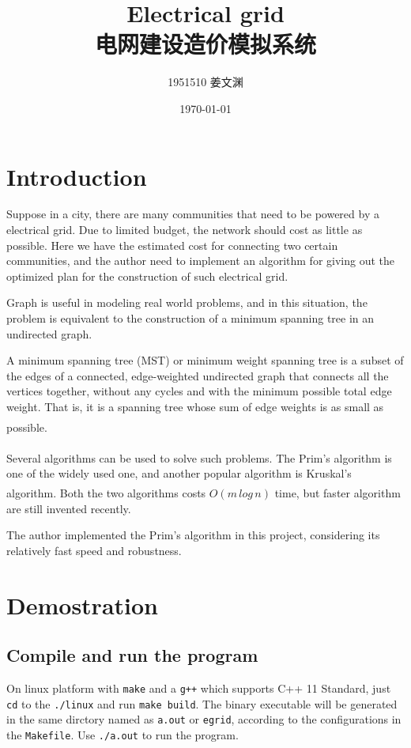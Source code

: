 \documentclass[cn,black,12pt,normal]{elegantnote}
\title{Electrical grid\\电网建设造价模拟系统}
\author{1951510\; 姜文渊}
\institute{\small \url{https://github.com/jwyjohn/Jwy_DataStructureHomework}}
\date{\today}
\newcommand{\uct}[1]{\textsuperscript{\textsuperscript{\cite{#1}}}}
\begin{document}
\maketitle

\section{Introduction}

Suppose in a city, there are many communities that need to be powered by a electrical grid. Due to limited budget, the network should cost as little as possible. Here we have the estimated cost for connecting two certain communities, and the author need to implement an algorithm for giving out the optimized plan for the construction of such electrical grid.

Graph is useful in modeling real world problems, and in this situation, the problem is equivalent to the construction of a minimum spanning tree in an undirected graph.

A minimum spanning tree (MST) or minimum weight spanning tree is a subset of the edges of a connected, edge-weighted undirected graph that connects all the vertices together, without any cycles and with the minimum possible total edge weight. That is, it is a spanning tree whose sum of edge weights is as small as possible.\uct{wiki:Minimum_spanning_tree}

Several algorithms can be used to solve such problems. The Prim's algorithm\uct{cheriton1976finding} is one of the widely used one, and another popular algorithm is Kruskal's algorithm\uct{kruskal1956shortest}. Both the two algorithms costs $O(m\, log\, n)$ time, but faster algorithm are still invented recently.

The author implemented the Prim's algorithm in this project, considering its relatively fast speed and robustness.


\section{Demostration}

\subsection{Compile and run the program}

On linux platform with \lstinline{make} and a \lstinline{g++} which supports C++ 11 Standard, just \lstinline{cd} to the \lstinline{./linux} and run \lstinline{make build}. The binary executable will be generated in the same dirctory named as \lstinline{a.out} or \lstinline{egrid}, according to the configurations in the \lstinline{Makefile}. Use \lstinline{./a.out} to run the program.
\end{document}
